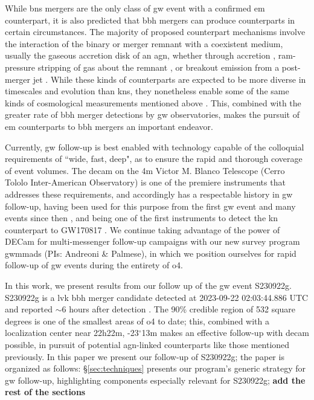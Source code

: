 \documentclass[twocolumn]{aastex631}
\newcommand{\gweventid}{S230922g}
\newcommand{\todo}[1]{\textbf{\color{red} #1}}
\begin{document}
While \gls{bns} mergers are the only class of \gls{gw} event with a confirmed \gls{em} counterpart, it is also predicted that \gls{bbh} mergers can produce counterparts in certain circumstances.
The majority of proposed counterpart mechanisms involve the interaction of the binary or merger remnant with a coexistent medium, usually the gaseous accretion disk of an \gls{agn}, whether through accretion \citep{bartosRapidBrightStellarmass2017}, ram-pressure stripping of gas about the remnant \citep{mckernanRampressureStrippingKicked2019}, or breakout emission from a post-merger jet \citep{tagawaObservableSignatureMerging2023}.
While these kinds of counterparts are expected to be more diverse in timescales and evolution than \glspl{kn}, they nonetheless enable some of the same kinds of cosmological measurements mentioned above \citep{palmeseLIGOVirgoBlack2021,bomStandardSirenCosmology2023}.
This, combined with the greater rate of \gls{bbh} merger detections by \gls{gw} observatories, makes the pursuit of \gls{em} counterparts to \gls{bbh} mergers an important endeavor.

Currently, \gls{gw} follow-up is best enabled with technology capable of the colloquial requirements of ``wide, fast, deep", as to ensure the rapid and thorough coverage of event volumes.
The \gls{decam} on the 4m Victor M. Blanco Telescope (Cerro Tololo Inter-American Observatory) is one of the premiere instruments that addresses these requirements, and accordingly has a respectable history in \gls{gw} follow-up, having been used for this purpose from the first \gls{gw} event \citep{soares-santosDARKENERGYCAMERA2016, annisDARKENERGYCAMERA2016} and many events since then \citep{hernerOpticalFollowupGravitational2020,andreoniGROWTHS190814bvDeep2020,morganConstraintsPhysicalProperties2020,garciaDESGWSearchElectromagnetic2020}, and being one of the first instruments to detect the \gls{kn} counterpart to GW170817 \citep{soares-santosElectromagneticCounterpartBinary2017}.
We continue taking advantage of the power of DECam for multi-messenger follow-up campaigns with our new survey program \gls{gwmmads} (PIs: Andreoni \& Palmese), in which we position ourselves for rapid follow-up of \gls{gw} events during the entirety of \gls{o4}.

In this work, we present results from our follow up of the \gls{gw} event \gweventid{}.
\gweventid{} is a \gls{lvk} \gls{bbh} merger candidate detected at 2023-09-22 02:03:44.886 UTC and reported $\sim$6 hours after detection \citep{ligoscientificcollaborationLIGOVirgoKAGRA2023}.
The 90\% credible region of 532 square degrees is one of the smallest areas of \gls{o4} to date; this, combined with a localization center near 22h22m, -23$^{\circ}$13m makes an effective follow-up with \gls{decam} possible, in pursuit of potential \gls{agn}-linked counterparts like those mentioned previously.
In this paper we present our follow-up of \gweventid{}; the paper is organized as follows:
\S\ref{sec:techniques} presents our program's generic strategy for \gls{gw} follow-up, highlighting components especially relevant for \gweventid{}; \todo{add the rest of the sections}
\end{document}
